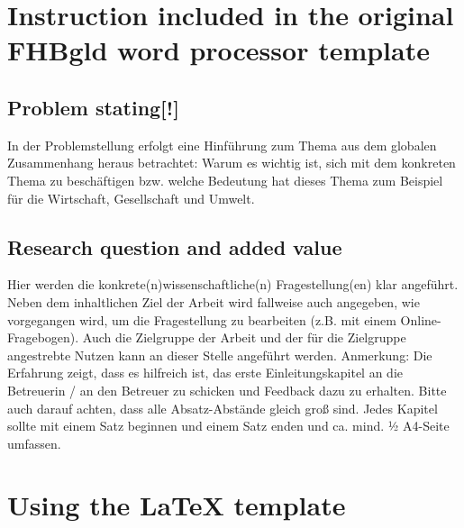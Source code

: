 %

\section{Instruction included in the original FHBgld word processor template}
\subsection{Problem stating[!]}
In der Problemstellung erfolgt eine Hinführung zum Thema aus dem globalen
Zusammenhang heraus betrachtet: Warum es wichtig ist, sich mit dem konkreten
Thema zu beschäftigen bzw. welche Bedeutung hat dieses Thema zum Beispiel für die
Wirtschaft, Gesellschaft und Umwelt.
\subsection{Research question and added value}
Hier werden die konkrete(n)wissenschaftliche(n) Fragestellung(en) klar angeführt.
Neben dem inhaltlichen Ziel der Arbeit wird fallweise auch angegeben, wie
vorgegangen wird, um die Fragestellung zu bearbeiten (z.B. mit einem Online-
Fragebogen). Auch die Zielgruppe der Arbeit und der für die Zielgruppe angestrebte
Nutzen kann an dieser Stelle angeführt werden.
Anmerkung:
Die Erfahrung zeigt, dass es hilfreich ist, das erste Einleitungskapitel an die Betreuerin
/ an den Betreuer zu schicken und Feedback dazu zu erhalten.
Bitte auch darauf achten, dass alle Absatz-Abstände gleich groß sind.
Jedes Kapitel sollte mit einem Satz beginnen und einem Satz enden und ca. mind. 1⁄2
A4-Seite umfassen.

\section{Using the \LaTeX{} template}

